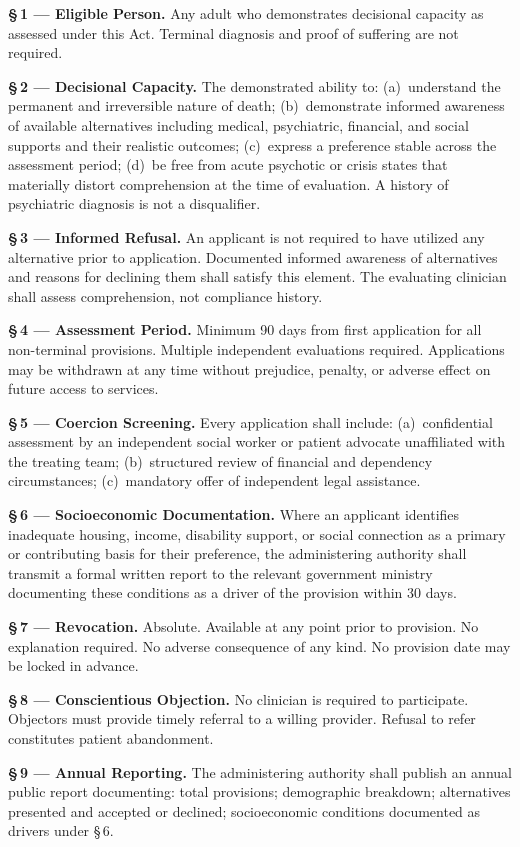 \documentclass[11pt, letterpaper]{article}
\begin{document}
\begin{statutebox}
\sffamily\small\setlength{\parskip}{0.55em}

\textbf{\S\,1 --- Eligible Person.}
Any adult who demonstrates decisional capacity as assessed under this Act.
Terminal diagnosis and proof of suffering are not required.

\textbf{\S\,2 --- Decisional Capacity.}
The demonstrated ability to: (a)~understand the permanent and irreversible nature of
death; (b)~demonstrate informed awareness of available alternatives including medical,
psychiatric, financial, and social supports and their realistic outcomes; (c)~express a
preference stable across the assessment period; (d)~be free from acute psychotic or
crisis states that materially distort comprehension at the time of evaluation.
A history of psychiatric diagnosis is not a disqualifier.

\textbf{\S\,3 --- Informed Refusal.}
An applicant is not required to have utilized any alternative prior to application.
Documented informed awareness of alternatives and reasons for declining them shall
satisfy this element. The evaluating clinician shall assess comprehension, not
compliance history.

\textbf{\S\,4 --- Assessment Period.}
Minimum 90 days from first application for all non-terminal provisions.
Multiple independent evaluations required. Applications may be withdrawn at any time
without prejudice, penalty, or adverse effect on future access to services.

\textbf{\S\,5 --- Coercion Screening.}
Every application shall include: (a)~confidential assessment by an independent social
worker or patient advocate unaffiliated with the treating team; (b)~structured review of
financial and dependency circumstances; (c)~mandatory offer of independent legal assistance.

\textbf{\S\,6 --- Socioeconomic Documentation.}
Where an applicant identifies inadequate housing, income, disability support, or social
connection as a primary or contributing basis for their preference, the administering
authority shall transmit a formal written report to the relevant government ministry
documenting these conditions as a driver of the provision within 30 days.

\textbf{\S\,7 --- Revocation.}
Absolute. Available at any point prior to provision. No explanation required. No adverse
consequence of any kind. No provision date may be locked in advance.

\textbf{\S\,8 --- Conscientious Objection.}
No clinician is required to participate. Objectors must provide timely referral to a
willing provider. Refusal to refer constitutes patient abandonment.

\textbf{\S\,9 --- Annual Reporting.}
The administering authority shall publish an annual public report documenting: total
provisions; demographic breakdown; alternatives presented and accepted or declined;
socioeconomic conditions documented as drivers under \S\,6.
\end{statutebox}
\end{document}
